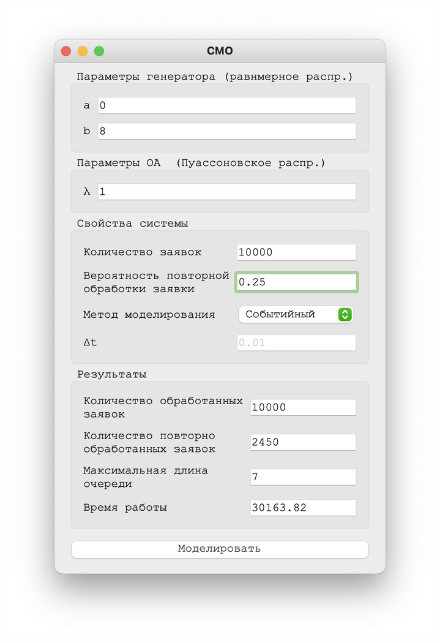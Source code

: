  \begin{figure}[!htb]
    \begin{minipage}{0.55\textwidth}
      \centering
      \includegraphics[width=1\linewidth]{1-25-s}
    \end{minipage}\hfill
    \begin{minipage}{0.55\textwidth}
      \centering

\end{minipage}
\end{figure}
